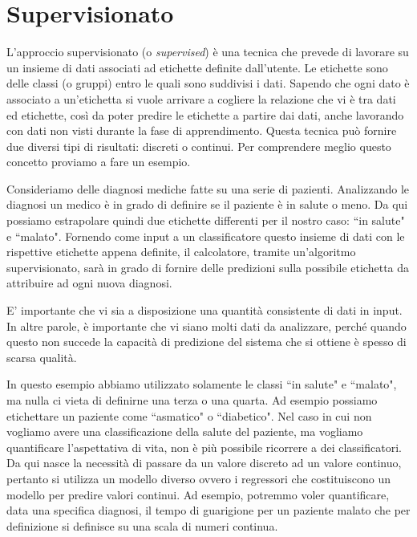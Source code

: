 \documentclass[12pt,italian]{report}
\begin{document}
\section{Supervisionato}

L'approccio supervisionato (o \emph{supervised}) è una tecnica che prevede di lavorare su un insieme di dati associati ad etichette definite dall'utente. Le etichette sono delle classi (o gruppi) entro le quali sono suddivisi i dati. Sapendo che ogni dato è associato a un'etichetta si vuole arrivare a cogliere la relazione che vi è tra dati ed etichette, così da poter predire le etichette a partire dai dati, anche lavorando con dati non visti durante la fase di apprendimento.
Questa tecnica può fornire due diversi tipi di risultati: discreti o continui. Per comprendere meglio questo concetto proviamo a fare un esempio.

Consideriamo delle diagnosi mediche fatte su una serie di pazienti. Analizzando le diagnosi un medico è in grado di definire se il paziente è in salute o meno. Da qui possiamo estrapolare quindi due etichette differenti per il nostro caso: ``in salute" e ``malato". Fornendo come input a un classificatore questo insieme di dati con le rispettive etichette appena definite, il calcolatore, tramite un'algoritmo supervisionato, sarà in grado di fornire delle predizioni sulla possibile etichetta da attribuire ad ogni nuova diagnosi.

E' importante che vi sia a disposizione una quantità consistente di dati in input. In altre parole, è importante che vi siano molti dati da analizzare, perché quando questo non succede la capacità di predizione del sistema che si ottiene è spesso di scarsa qualità.

In questo esempio abbiamo utilizzato solamente le classi ``in salute" e ``malato", ma nulla ci vieta di definirne una terza o una quarta. Ad esempio possiamo etichettare un paziente come ``asmatico" o ``diabetico".
Nel caso in cui non vogliamo avere una classificazione della salute del paziente, ma vogliamo quantificare l'aspettativa di vita, non è più possibile ricorrere a dei classificatori. Da qui nasce la necessità di passare da un valore discreto ad un valore continuo, pertanto si utilizza un modello diverso ovvero i regressori che costituiscono un modello per predire valori continui. Ad esempio, potremmo voler quantificare, data una specifica diagnosi, il tempo di guarigione per un paziente malato che per definizione si definisce su una scala di numeri continua.
\end{document}
